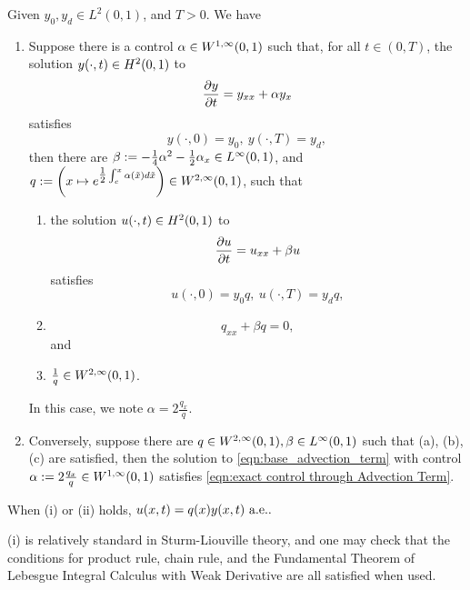 \documentclass{ifacconf}
\def\RG{}
\begin{document}
\begin{thm}
    \cite[Theorem~4.1.3]{yixing_multiplicative_2025}
    Given $y_0, y_d \in L^2(0,1)$, and $T > 0$. We have
    \begin{enumerate}[label=\roman*.]
        \item 
        Suppose there is a control $\alpha \in {W^{1, \infty}_{}{\left ( 0,1 \right )}}$ such that, \RG{for all $t \in (0,T)$, the solution $y(\cdot, t) \in {H^{2}_{}{\left ( 0,1 \right )}}$ to 
        \begin{equation}
        \label{eqn:base_advection_term}
            \frac{\partial y}{\partial t} = y_{xx}+\alpha y_x 
        \end{equation} satisfies
        \begin{equation}
        \label{eqn:exact control through Advection Term}
            y(\cdot, 0) = y_0,\ 
            y(\cdot, T) = y_d,
        \end{equation} 
        }
        then there are $\beta := -\frac{1}{4}\alpha^2-{\textstyle\frac{1}{2}} \alpha_{x} \in {L^{\infty}_{}{\left ( 0,1 \right )}}$, and $q := \rndbracket{x \mapsto e^{\half \int_c^x\alpha(\tilde{x})d\tilde{x}}} \in \Sobo{2,\infty}{}{0,1}$, such that
        \begin{enumerate}
            \item the solution $u(\cdot, t) \in {H^{2}_{}{\left ( 0,1 \right )}}$ to
        \begin{equation}
        \label{eqn:base_reaction_term}
            \frac{\partial u}{\partial t} = u_{xx}+\beta u 
        \end{equation} satisfies
        \begin{equation}
        \label{condition:a-control through reaction term}
                u(\cdot, 0) = y_0q,\
                u(\cdot, T) = y_dq,
        \end{equation}
            \item 
            \begin{equation}
            \label{condition:b-relationship between q and beta}
                q_{xx} + \beta q = 0,
            \end{equation} and
            \item $\frac{1}{q} \in {W^{2,\infty}_{}{\left ( 0,1 \right )}}$.
        \end{enumerate}
        In this case, we note $\alpha = 2\frac{q_x}{q}$.
        \item       
        Conversely, suppose there are $q \in {W^{2, \infty}_{}{\left ( 0,1 \right )}}, \beta \in {L^{\infty}_{}{\left ( 0,1 \right )}}$ such that (a), (b), (c) are satisfied,
        then the solution to \eqref{eqn:base_advection_term} with control $\alpha := 2\frac{q_x}{q} \in {W^{1,\infty}_{}{\left ( 0,1 \right )}}$ satisfies \eqref{eqn:exact control through Advection Term}.
    \end{enumerate}
    When (i) or (ii) holds, $u(x,t) = q(x)y(x,t) ~\text{a.e.}.$
\begin{pf}
(i) is relatively standard in Sturm-Liouville theory, and one may check that the conditions for product rule, chain rule, and the Fundamental Theorem of Lebesgue Integral Calculus with Weak Derivative are all satisfied when used.
    

\end{pf}
\end{thm}
\end{document}

